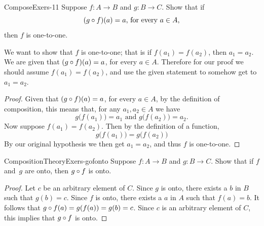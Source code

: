 \begin{example}{ComposeExers-11}
Suppose $f\colon A \to B$ and $g \colon B \to C$. Show that if 
$$\mbox{$(g \circ f)(a) = a$, for every $a \in A$,} $$
 then $f$ is one-to-one.
 
 \begin{scratchwork}
 We want to show that $f$ is one-to-one; that is if $f(a_1) = f(a_2)$, then $a_1 = a_2$.  We are given that $(g \circ f)(a) = a$, for every $a \in A$.  Therefore for our proof we should assume $f(a_1) = f(a_2)$, and use the given statement to somehow get to $a_1 = a_2$. 
 \end{scratchwork}
 
 \begin{proof}
Given that $(g \circ f)(a) = a$, for every $a \in A$, by the definition of composition, this means
that, for any $a_1, a_2 \in A$ we have
$$ g \bigl( f(a_1) \bigr) = a_1 \mbox{ and }  g \bigl( f(a_2) \bigr) = a_2.$$
Now suppose $f(a_1) = f(a_2)$. Then by the definition of a function, 
$$ g \bigl( f(a_1) \bigr) =  g \bigl( f(a_2) \bigr)$$
By our original hypothesis we then get $a_1 = a_2$, and thus $f$ is one-to-one.
\end{proof}    
 \end{example}

\begin{example}{CompositionTheoryExers-gofonto} 
 Suppose $f \colon A \to B$ and $g \colon B \to C$. Show that if $f$ and~$g$ are onto, then $g \circ f$ is onto.

 \begin{proof}
Let $c$ be an arbitrary  element of $C$. Since $g$ is onto, there exists a $b$ in  $B$ such that $g(b) = c$.  Since $f$ is onto, there exists a $a$ in  $A$ such that $f(a) = b$. It follows that  $g \circ f(a) = g(f(a)) = g(b) = c$. Since $c$ is an arbitrary element of $C$, this implies that $g \circ f$ is onto.
\end{proof}    
 \end{example}


